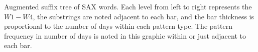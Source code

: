 Augmented suffix tree of SAX words. Each level from left to right represents the $W1-W4$, the substrings are noted adjacent to each bar, and the bar thickness is proportional to the number of days within each pattern type. The pattern frequency in number of days is noted in this graphic within or just adjacent to each bar. \cite{miller_automated_2015}
\label{fig:saxdiscordsankey}